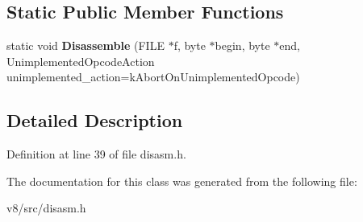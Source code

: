 \subsection*{Static Public Member Functions}
\begin{DoxyCompactItemize}
\item 
\mbox{\label{classdisasm_1_1Disassembler_a81d16cbce8f84245d36d374e0054acc2}} 
static void {\bfseries Disassemble} (F\+I\+LE $\ast$f, byte $\ast$begin, byte $\ast$end, Unimplemented\+Opcode\+Action unimplemented\+\_\+action=k\+Abort\+On\+Unimplemented\+Opcode)
\end{DoxyCompactItemize}


\subsection{Detailed Description}


Definition at line 39 of file disasm.\+h.



The documentation for this class was generated from the following file\+:\begin{DoxyCompactItemize}
\item 
v8/src/disasm.\+h\end{DoxyCompactItemize}
